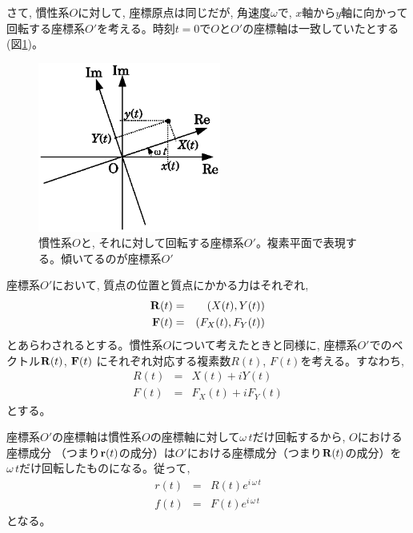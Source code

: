さて, 慣性系$O$に対して, 座標原点は同じだが, 角速度$\omega$で, $x$軸から$y$軸に向かって回転する座標系$O'$を考える。時刻$t=0$で$O$と$O'$の座標軸は一致していたとする(図\ref{fig:inert_circle})。

\begin{figure}[h]
    \centering
    \includegraphics[width=6cm]{inert_circle.eps}
    \caption{慣性系$O$と, それに対して回転する座標系$O'$。複素平面で表現する。傾いてるのが座標系$O'$}\label{fig:inert_circle}
\end{figure}

座標系$O'$において, 質点の位置と質点にかかる力はそれぞれ, 
\begin{eqnarray}
{\bf R}(t)&=&(X(t), Y(t))\\
{\bf F}(t)&=&(F_X(t), F_Y(t))
\end{eqnarray}
とあらわされるとする。慣性系$O$について考えたときと同様に, 座標系$O'$でのベクトル${\bf R}(t)$, ${\bf F}(t)$
にそれぞれ対応する複素数$R(t)$, $F(t)$を考える。すなわち, 
\begin{eqnarray}
R(t)&=&X(t)+iY(t)\\
F(t)&=&F_X(t)+iF_Y(t)
\end{eqnarray}
とする。

座標系$O'$の座標軸は慣性系$O$の座標軸に対して$\omega\,t$だけ回転するから, $O$における座標成分
（つまり${\bf r}(t)$の成分）は$O'$における座標成分（つまり${\bf R}(t)$の成分）を
$\omega\,t$だけ回転したものになる。従って, 
\begin{eqnarray}
r(t)&=&R(t)e^{i\,\omega\,t}\label{eq:rRrotat}\\
f(t)&=&F(t)e^{i\,\omega\,t}\label{eq:fFrotat}
\end{eqnarray}
となる。

